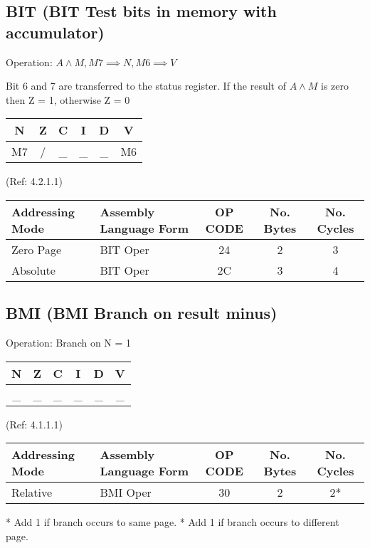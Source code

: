 \documentclass{article}
\begin{document}
  \subsection{BIT (BIT Test bits in memory with accumulator)}

  Operation:  $A \land M, M7 \implies N, M6 \implies V$

  Bit 6 and 7 are transferred to the status register.
  If the result of $A \land M$ is zero then Z = 1, otherwise
  Z = 0
  \begin{table}[H]
  \centering                           
  \begin{tabular}{|c c c c c c|}
  \hline
  N&Z&C&I&D&V\\
  \hline
  M7 & / & \_ & \_ & \_ & M6\\
  \hline
  \end{tabular}
  \end{table}
                               (Ref: 4.2.1.1)
  \begin{table}[H]
  \centering
  \begin{tabular}{|l|l|c|c|c|}
  \hline
  Addressing Mode & Assembly Language Form & OP CODE & No. Bytes & No. Cycles\\
  \hline
  Zero Page     &   BIT Oper            &    24   &    2    &    3\\
  Absolute      &   BIT Oper            &    2C   &    3    &    4\\
  \hline
  \end{tabular}
  \end{table}


  \subsection{BMI (BMI Branch on result minus)}

  Operation:  Branch on N = 1
  \begin{table}[H]
  \centering                           
  \begin{tabular}{|c c c c c c|}
  \hline
  N&Z&C&I&D&V\\
  \hline
  \_ & \_ & \_ & \_ & \_ & \_\\
  \hline
  \end{tabular}
  \end{table}
                               (Ref: 4.1.1.1)
  \begin{table}[H]
  \centering
  \begin{tabular}{|l|l|c|c|c|}
  \hline
  Addressing Mode& Assembly Language Form& OP CODE &No. Bytes&No. Cycles\\
  \hline
  Relative      &   BMI Oper            &    30   &    2    &    2*\\
  \hline
  \end{tabular}
  \end{table}
  * Add 1 if branch occurs to same page.
  * Add 1 if branch occurs to different page.
\end{document}
